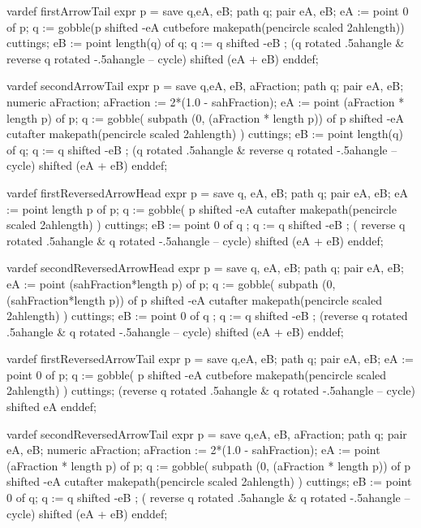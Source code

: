   vardef firstArrowTail expr p =
    save q,eA, eB; path q; pair eA, eB;
    eA := point 0 of p;
    q := gobble(p shifted -eA cutbefore makepath(pencircle scaled 2ahlength))
      cuttings;
    eB := point length(q) of q;
    q := q shifted -eB ;
    (q rotated .5ahangle & reverse q rotated -.5ahangle -- cycle)
      shifted (eA + eB)
  enddef;
  
  vardef secondArrowTail expr p =
    save q,eA, eB, aFraction; path q; pair eA, eB; numeric aFraction;
    aFraction := 2*(1.0 - sahFraction);
    eA := point (aFraction * length p) of p;
    q := gobble(
      subpath (0, (aFraction * length p)) of p shifted -eA
      cutafter makepath(pencircle scaled 2ahlength)
    ) cuttings;
    eB := point length(q) of q;
    q := q shifted -eB ;
    (q rotated .5ahangle & reverse q rotated -.5ahangle -- cycle)
      shifted (eA + eB)
  enddef;

  
  vardef firstReversedArrowHead expr p =
    save q, eA, eB; path q; pair eA, eB;
    eA := point length p of p;
    q := gobble(
      p shifted -eA 
      cutafter makepath(pencircle scaled 2ahlength)
    ) cuttings;
    eB := point 0 of q ;
    q := q shifted -eB ;
    ( reverse q rotated .5ahangle & q rotated -.5ahangle -- cycle)
      shifted (eA + eB)
  enddef;

  vardef secondReversedArrowHead expr p =
    save q, eA, eB; path q; pair eA, eB;
    eA := point (sahFraction*length p) of p;
    q := gobble(
      subpath (0, (sahFraction*length p)) of p shifted -eA 
      cutafter makepath(pencircle scaled 2ahlength)
    ) cuttings;
    eB := point 0 of q ;
    q := q shifted -eB ;
    (reverse q rotated .5ahangle & q rotated -.5ahangle -- cycle)
      shifted (eA + eB)
  enddef;

  vardef firstReversedArrowTail expr p =
    save q,eA, eB; path q; pair eA, eB;
    eA := point 0 of p;
    q := gobble(
      p shifted -eA
      cutbefore makepath(pencircle scaled 2ahlength)
    ) cuttings;
    (reverse q rotated .5ahangle & q rotated -.5ahangle -- cycle)
      shifted eA
  enddef;
  
  vardef secondReversedArrowTail expr p =
    save q,eA, eB, aFraction; path q; pair eA, eB; numeric aFraction;
    aFraction := 2*(1.0 - sahFraction);
    eA := point (aFraction * length p) of p;
    q := gobble(
      subpath (0, (aFraction * length p)) of p shifted -eA
      cutafter makepath(pencircle scaled 2ahlength)
    ) cuttings;
    eB := point 0 of q;
    q := q shifted -eB ;
    ( reverse q rotated .5ahangle & q rotated -.5ahangle -- cycle)
      shifted (eA + eB)
  enddef;
  
